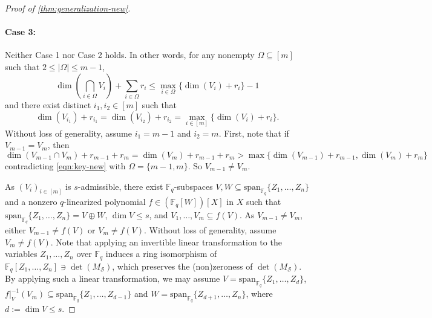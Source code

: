 \documentclass[11pt]{article}
\theoremstyle{plain}
\theoremstyle{definition}
\theoremstyle{remark}
\newcommand{\F}{\mathbb{F}}
\newcommand{\cS}{\mathcal{S}}
\begin{document}
\begin{proof}[Proof of \cref{thm:generalization-new}]
\paragraph{Case 3:} Neither Case 1 nor Case 2 holds. In other words, for any nonempty $\Omega\subseteq [m]$ such that $2\leq |\Omega|\leq m-1$, 
\begin{equation}\label{eq:non-tightness-2}
\dim\left(\bigcap_{i\in \Omega}V_i\right)+\sum_{i\in \Omega}r_i \leq \max_{i\in \Omega}\{\dim(V_i)+r_i\}-1
\end{equation}
and there exist distinct $i_1,i_2\in [m]$ such that 
\begin{equation}\label{eq:attain-max}
\dim(V_{i_1})+r_{i_1}=\dim(V_{i_2})+r_{i_2}=\max_{i\in [m]}\{\dim (V_i)+r_i\}. 
\end{equation}
Without loss of generality, assume $i_1=m-1$ and $i_2=m$. First, note that if $V_{m-1}=V_m$, then 
\[
\dim(V_{m-1}\cap V_m)+r_{m-1}+r_m=\dim(V_m)+r_{m-1}+r_m>\max\{\dim(V_{m-1})+r_{m-1},\dim(V_m)+r_m\}
\]
contradicting \eqref{eqn:key-new} with $\Omega=\{m-1,m\}$.
So $V_{m-1}\neq V_m$.

As $(V_i)_{i\in [m]}$ is $s$-admissible, there exist $\F_q$-subspaces $V,W\subseteq \mathrm{span}_{\F_q}\{Z_1,\dots,Z_{n}\}$ and a nonzero $q$-linearized polynomial $f\in (\F_q[W])[X]$ in $X$ such that $\mathrm{span}_{\F_q}\{Z_1,\dots,Z_{n}\}=V\oplus W$, $\dim V\leq s$, and
$V_1,\dots,V_m\subseteq f(V)$.
As $V_{m-1}\neq V_m$, either $V_{m-1}\neq f(V)$ or $V_m\neq f(V)$.
Without loss of generality, assume $V_m\neq f(V)$.
Note that applying an invertible linear transformation to the variables $Z_1,\dots,Z_n$ over $\F_q$ induces a ring isomorphism of $\F_q[Z_1,\dots,Z_n]\ni \det(M_{\cS})$, which preserves the (non)zeroness of $\det(M_{\cS})$. By applying such a linear transformation, we may assume $V=\mathrm{span}_{\F_q}\{Z_1,\dots,Z_d\}$, $f|_V^{-1}(V_m)\subseteq \mathrm{span}_{\F_q}\{Z_1,\dots,Z_{d-1}\}$ and $W=\mathrm{span}_{\F_q}\{Z_{d+1},\dots,Z_n\}$, where $d:=\dim V\leq s$. 



\end{proof}
\end{document}
